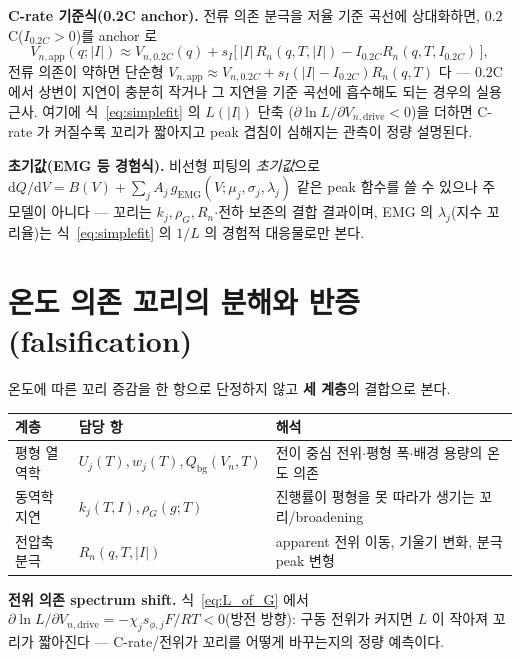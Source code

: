 \documentclass[11pt,a4paper]{article}
\newcommand{\dd}{\mathrm{d}}
\newcommand{\app}{\mathrm{app}}
\newcommand{\drive}{\mathrm{drive}}
\newcommand{\bg}{\mathrm{bg}}
\begin{document}
\textbf{C-rate 기준식(0.2C anchor).} 전류 의존 분극을 저율 기준 곡선에 상대화하면, $0.2$C($I_{0.2C}>0$)를 anchor 로
\begin{equation}
V_{n,\app}(q;|I|)\approx V_{n,0.2C}(q)+s_I\big[\,|I|\,R_n(q,T,|I|)-I_{0.2C}R_n(q,T,I_{0.2C})\,\big],
\label{eq:02c}
\end{equation}
전류 의존이 약하면 단순형 $V_{n,\app}\approx V_{n,0.2C}+s_I(|I|-I_{0.2C})R_n(q,T)$ 다 — $0.2$C 에서 상변이 지연이
충분히 작거나 그 지연을 기준 곡선에 흡수해도 되는 경우의 실용 근사. 여기에 식~\eqref{eq:simplefit} 의 $L(|I|)$ 단축
($\partial\ln L/\partial V_{n,\drive}<0$)을 더하면 C-rate 가 커질수록 꼬리가 짧아지고 peak 겹침이 심해지는 관측이
정량 설명된다.

\textbf{초기값(EMG 등 경험식).} 비선형 피팅의 \emph{초기값}으로 $\dd Q/\dd V=B(V)+\sum_j A_j\,g_\mathrm{EMG}
(V;\mu_j,\sigma_j,\lambda_j)$ 같은 peak 함수를 쓸 수 있으나 주 모델이 아니다 — 꼬리는 $k_j,\rho_G,R_n$$\cdot$전하
보존의 결합 결과이며, EMG 의 $\lambda_j$(지수 꼬리율)는 식~\eqref{eq:simplefit} 의 $1/L$ 의 경험적 대응물로만 본다.

\section{온도 의존 꼬리의 분해와 반증(falsification)}\label{sec:falsify}
온도에 따른 꼬리 증감을 한 항으로 단정하지 않고 \textbf{세 계층}의 결합으로 본다.
\begin{longtable}{p{} p{} p{}}
\toprule 계층 & 담당 항 & 해석 \\ \midrule \endhead
평형 열역학 & $U_j(T),w_j(T),Q_\bg(V_n,T)$ & 전이 중심 전위$\cdot$평형 폭$\cdot$배경 용량의 온도 의존 \\
동역학 지연 & $k_j(T,I),\rho_G(g;T)$ & 진행률이 평형을 못 따라가 생기는 꼬리/broadening \\
전압축 분극 & $R_n(q,T,|I|)$ & apparent 전위 이동, 기울기 변화, 분극 peak 변형 \\
\bottomrule
\end{longtable}
\textbf{전위 의존 spectrum shift.} 식~\eqref{eq:L_of_G} 에서 $\partial\ln L/\partial V_{n,\drive}
=-\chi_j s_{\phi,j}F/RT<0$(방전 방향): 구동 전위가 커지면 $L$ 이 작아져 꼬리가 짧아진다 — C-rate/전위가
꼬리를 어떻게 바꾸는지의 정량 예측이다.
\end{document}

